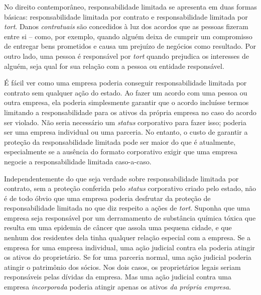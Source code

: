 No direito contemporâneo, responsabilidade limitada se apresenta em duas formas básicas: responsabilidade limitada por contrato e responsabilidade limitada por \emph{tort}. Danos \emph{contratuais} são concedidos à luz dos acordos que as pessoas fizeram entre si -- como, por exemplo, quando alguém deixa de cumprir um compromisso de entregar bens prometidos e causa um prejuízo de negócios como resultado. Por outro lado, uma pessoa é responsável por \emph{tort} quando prejudica os interesses de alguém, seja qual for sua relação com a pessoa ou entidade responsável.

É fácil ver como uma empresa poderia conseguir responsabilidade limitada por contrato sem qualquer ação do estado. Ao fazer um acordo com uma pessoa ou outra empresa, ela poderia simplesmente garantir que o acordo incluísse termos limitando a responsabilidade para os ativos da própria empresa no caso do acordo ser violado. Não seria necessário um \emph{status} corporativo para fazer isso; poderia ser uma empresa individual ou uma parceria. No entanto, o custo de garantir a proteção da responsabilidade limitada pode ser maior do que é atualmente, especialmente se a ausência do formato corporativo exigir que uma empresa negocie a responsabilidade limitada caso-a-caso.

Independentemente do que seja verdade sobre responsabilidade limitada por contrato, sem a proteção conferida pelo \emph{status} corporativo criado pelo estado, não é de todo óbvio que uma empresa poderia desfrutar da proteção de responsabilidade limitada no que diz respeito a ações de \emph{tort}. Suponha que uma empresa seja responsável por um derramamento de substância química tóxica que resulta em uma epidemia de câncer que assola uma pequena cidade, e que nenhum dos residentes dela tinha qualquer relação especial com a empresa. Se a empresa for uma empresa individual, uma ação judicial contra ela poderia atingir os ativos do proprietário. Se for uma parceria normal, uma ação judicial poderia atingir o patrimônio dos sócios. Nos dois casos, os proprietários legais seriam responsáveis pelas dívidas da empresa. Mas uma ação judicial contra uma empresa \emph{incorporada} poderia atingir apenas os ativos \emph{da própria empresa}.

